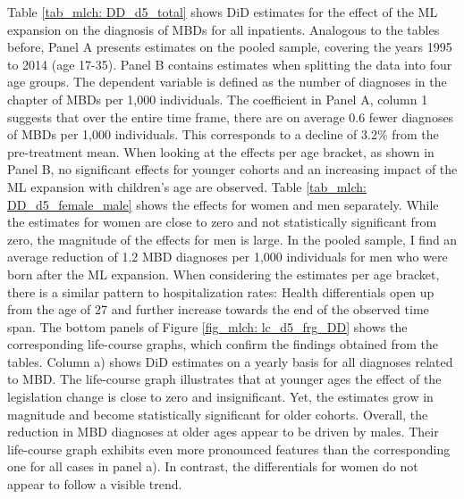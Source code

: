 Table \ref{tab_mlch: DD_d5_total} shows DiD estimates for the effect of the ML expansion on the diagnosis of MBDs for all inpatients. Analogous to the tables before, Panel A presents estimates on the pooled sample, covering the years 1995 to 2014 (age 17-35). Panel B contains estimates when splitting the data into four age groups. The dependent variable is defined as the number of diagnoses in the chapter of MBDs per 1,000 individuals. The coefficient in Panel A, column 1 suggests that over the entire time frame, there are on average 0.6 fewer diagnoses of MBDs per 1,000 individuals. This corresponds to a decline of 3.2\% from the pre-treatment mean. When looking at the effects per age bracket, as shown in Panel B, no significant effects for younger cohorts and an increasing impact of the ML expansion with children's age are observed. Table \ref{tab_mlch: DD_d5_female_male} shows the effects for women and men separately. While the estimates for women are close to zero and not statistically significant from zero, the magnitude of the effects for men is large. In the pooled sample, I find an average reduction of 1.2 MBD diagnoses per 1,000 individuals for men who were born after the ML expansion. When considering the estimates per age bracket, there is a similar pattern to hospitalization rates: Health differentials open up from the age of 27 and further increase towards the end of the observed time span. The bottom panels of Figure \ref{fig_mlch: lc_d5_frg_DD} shows the corresponding life-course graphs, which confirm the findings obtained from the tables. Column a) shows DiD estimates on a yearly basis for all diagnoses related to MBD. The life-course graph illustrates that at younger ages the effect of the legislation change is close to zero and insignificant. Yet, the estimates grow in magnitude and become statistically significant for older cohorts. Overall, the reduction in MBD diagnoses at older ages appear to be driven by males. Their life-course graph exhibits even more pronounced features than the corresponding one for all cases in panel a). In contrast, the differentials for women do not appear to follow a visible trend.  \label{rev_mlch: editor_parallel_trends_text_d5}

